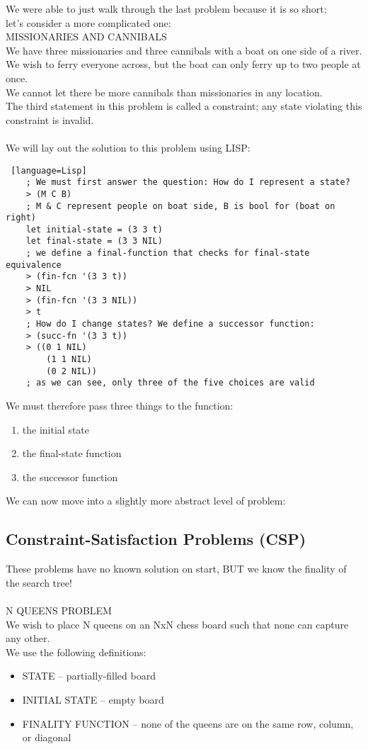 \documentclass[../../lecture_notes.tex]{subfiles}
\begin{document}
\noindent We were able to just walk through the last problem because it is so short; \\
	let’s consider a more complicated one:\\

\noindent MISSIONARIES AND CANNIBALS\\
\indent We have three missionaries and three cannibals with a boat on one side of a river.\\
\indent We wish to ferry everyone across, but the boat can only ferry up to two people at once.\\
\indent We cannot let there be more cannibals than missionaries in any location.\\
The third statement in this problem is called a constraint; any state violating this constraint is invalid.\\
\\
We will lay out the solution to this problem using LISP:
\begin{lstlisting} [language=Lisp]
	; We must first answer the question: How do I represent a state?
	> (M C B)
	; M & C represent people on boat side, B is bool for (boat on right)
	let initial-state = (3 3 t) 
	let final-state = (3 3 NIL) 
	; we define a final-function that checks for final-state equivalence
	> (fin-fcn '(3 3 t))
	> NIL
	> (fin-fcn '(3 3 NIL))
	> t
	; How do I change states? We define a successor function:
	> (succ-fn '(3 3 t))
	> ((0 1 NIL)
	    (1 1 NIL)
	    (0 2 NIL))
	; as we can see, only three of the five choices are valid
\end{lstlisting}
\noindent We must therefore pass three things to the function:
\begin{enumerate} [itemsep=0mm]
\item the initial state
\item the final-state function
\item the successor function
\end{enumerate}
We can now move into a slightly more abstract level of problem:\\
\subsection*{Constraint-Satisfaction Problems (CSP)}
\noindent These problems have no known solution on start, BUT we know the finality of the search tree!\\
\\
N QUEENS PROBLEM\\
\indent We wish to place N queens on an NxN chess board such that none can capture any other.\\
\indent We use the following definitions:\\
\begin{itemize} [itemsep=0mm]
\item STATE -- partially-filled board
\item INITIAL STATE -- empty board
\item FINALITY FUNCTION -- none of the queens are on the same row, column, or diagonal
\end{itemize}
\end{document}
